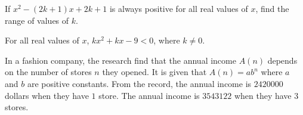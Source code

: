 \documentclass[addpoints, 10pt]{exam}
\begin{document}
\begin{questions}
	\question If $x^2-(2k+1)x+2k+1$ is always positive for all real values of $x$, find the range of values of $k$.
	\begin{solutionorlines}[9cm]
	\end{solutionorlines}
	\newpage
	\question For all real values of $x$, $kx^2+kx-9<0$, where $k\neq0$.
	\begin{solutionorlines}[9cm]
	\end{solutionorlines}
	\question 
	\begin{solutionorlines}[9cm]
	\end{solutionorlines}
	\newpage
	\question
	\begin{solutionorlines}[9cm]
	\end{solutionorlines}
	\question In a fashion company, the research find that the annual income $A(n)$ depends on the number of stores $n$ they opened. It is given that $A(n) = ab^n$ where $a$ and $b$ are positive constants. From the record, the annual income is $2 420 000$ dollars when they have $1$ store. The annual income is $3 543 122$ when they have $3$ stores.
	\begin{parts}

\end{parts}
\end{questions}
\end{document}
